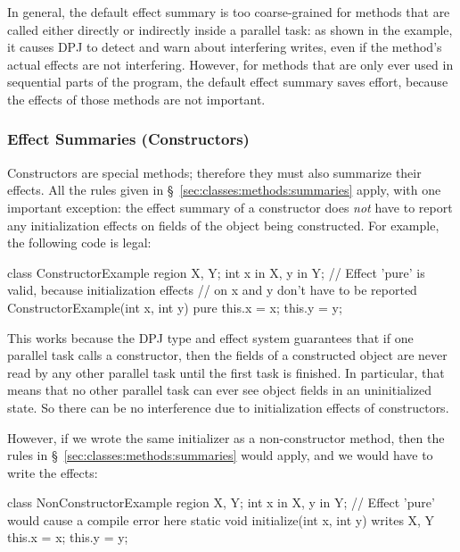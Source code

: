 In general, the default effect summary is too coarse-grained for
methods that are called either directly or indirectly inside a
parallel task: as shown in the example, it causes DPJ to detect and
warn about interfering writes, even if the method's actual effects are
not interfering.  However, for methods that are only ever used in
sequential parts of the program, the default effect summary saves
effort, because the effects of those methods are not important.

\subsubsection{Effect Summaries (Constructors)%
\label{sec:classes:methods:summaries-constructor}}

Constructors are special methods; therefore they must also summarize
their effects.  All the rules given in
\S~\ref{sec:classes:methods:summaries} apply, with one important
exception: the effect summary of a constructor does \emph{not} have to
report any initialization effects on fields of the object being
constructed.  For example, the following code is legal:
%
\begin{dpjlisting}
class ConstructorExample {
  region X, Y;
  int x in X, y in Y;
  // Effect 'pure' is valid, because initialization effects
  // on x and y don't have to be reported
  ConstructorExample(int x, int y) 
    pure 
  {
    this.x = x;
    this.y = y;
  }
}
\end{dpjlisting}
%
This works because the DPJ type and effect system guarantees that if
one parallel task calls a constructor, then the fields of a
constructed object are never read by any other parallel task until the
first task is finished.  In particular, that means that no other
parallel task can ever see object fields in an uninitialized state.
So there can be no interference due to initialization effects of
constructors.

However, if we wrote the same initializer as a non-constructor method,
then the rules in \S~\ref{sec:classes:methods:summaries} would apply,
and we would have to write the effects:
%
\begin{dpjlisting}
class NonConstructorExample {
  region X, Y;
  int x in X, y in Y;
  // Effect 'pure' would cause a compile error here
  static void initialize(int x, int y) 
    writes X, Y 
  {
    this.x = x;
    this.y = y;
  }
}
\end{dpjlisting}

